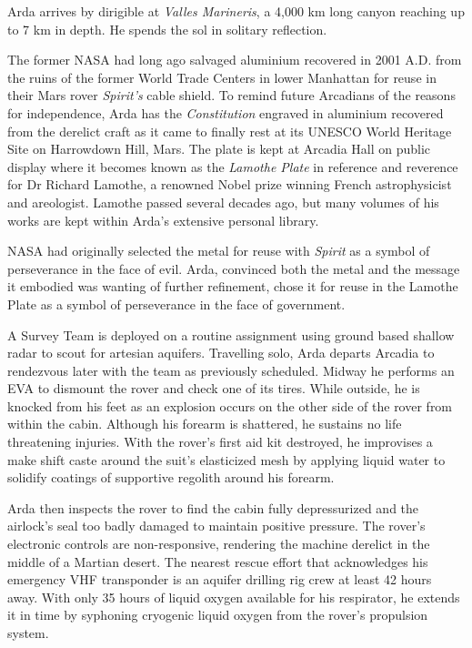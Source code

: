 Arda arrives by dirigible at {\it Valles Marineris}, a 4,000 km long canyon reaching up to 7 km in depth. He spends the sol in solitary reflection.

The former NASA had long ago salvaged aluminium recovered in 2001 A.D. from the ruins of the former World Trade Centers in lower Manhattan for reuse in their Mars rover {\it Spirit's} cable shield. To remind future Arcadians of the reasons for independence, Arda has the {\it Constitution} engraved in aluminium recovered from the derelict craft as it came to finally rest at its UNESCO World Heritage Site on Harrowdown Hill, Mars. The plate is kept at Arcadia Hall on public display where it becomes known as the {\it Lamothe Plate} in reference and reverence for Dr Richard Lamothe, a renowned Nobel prize winning French astrophysicist and areologist. Lamothe passed several decades ago, but many volumes of his works are kept within Arda's extensive personal library.

NASA had originally selected the metal for reuse with {\it Spirit} as a symbol of perseverance in the face of evil. Arda, convinced both the metal and the message it embodied was wanting of further refinement, chose it for reuse in the Lamothe Plate as a symbol of perseverance in the face of government.
\StopTimelineDate

A Survey Team is deployed on a routine assignment using ground based shallow radar to scout for artesian aquifers. Travelling solo, Arda departs Arcadia to rendezvous later with the team as previously scheduled. Midway he performs an EVA to dismount the rover and check one of its tires. While outside, he is knocked from his feet as an explosion occurs on the other side of the rover from within the cabin. Although his forearm is shattered, he sustains no life threatening injuries. With the rover's first aid kit destroyed, he improvises a make shift caste around the suit's elasticized mesh by applying liquid water to solidify coatings of supportive regolith around his forearm.

Arda then inspects the rover to find the cabin fully depressurized and the airlock's seal too badly damaged to maintain positive pressure. The rover's electronic controls are non-responsive, rendering the machine derelict in the middle of a Martian desert. The nearest rescue effort that acknowledges his emergency VHF transponder is an aquifer drilling rig crew at least 42 hours away. With only 35 hours of liquid oxygen available for his respirator, he extends it in time by syphoning cryogenic liquid oxygen from the rover's propulsion system.

